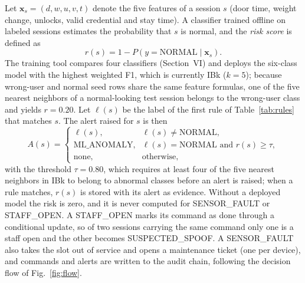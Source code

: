 \documentclass[journal,onecolumn]{IEEEtran}
\begin{document}
Let $\mathbf{x}_s = (d, w, u, v, t)$ denote the five features of a session $s$ (door time, weight change, unlocks,
valid credential and stay time). A classifier trained offline on labeled sessions estimates the probability that $s$
is normal, and the \emph{risk score} is defined as
\begin{equation}
r(s) = 1 - P\left(y = \text{NORMAL} \mid \mathbf{x}_s\right).
\label{eq:risk}
\end{equation}
The training tool compares four classifiers (Section~VI) and deploys the six-class model with the highest weighted F1,
which is currently IBk ($k=5$); because wrong-user and normal seed rows share the same feature formulas, one of the five
nearest neighbors of a normal-looking test session belongs to the wrong-user class and yields $r = 0.20$. Let
$\ell(s)$ be the label of the first rule of Table~\ref{tab:rules} that matches $s$. The alert raised for $s$ is then
\begin{equation}
A(s) =
\begin{cases}
\ell(s), & \ell(s) \neq \text{NORMAL},\\
\text{ML\_ANOMALY}, & \ell(s) = \text{NORMAL} \text{ and } r(s) \geq \tau,\\
\text{none}, & \text{otherwise},
\end{cases}
\label{eq:alert}
\end{equation}
with the threshold $\tau = 0.80$, which requires at least four of the five nearest neighbors in IBk to belong to
abnormal classes before an alert is raised; when a rule matches, $r(s)$ is stored with its alert as evidence. Without a
deployed model the risk is zero, and it is never computed for SENSOR\_FAULT or STAFF\_OPEN. A STAFF\_OPEN marks its
command as done through a conditional update, so of two sessions carrying the same command only one is a staff open and
the other becomes SUSPECTED\_SPOOF. A SENSOR\_FAULT also takes the slot out of service and opens a maintenance ticket
(one per device), and commands and alerts are written to the audit chain, following the decision flow of
Fig.~\ref{fig:flow}.
\end{document}
